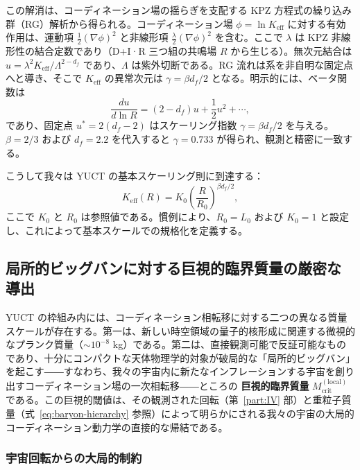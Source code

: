 \documentclass[11pt,a4paper]{article}
\newcommand{\Keff}{K_{\mathrm{eff}}}
\newcommand{\Lzero}{L_0}
\begin{document}
	この解消は、コーディネーション場の揺らぎを支配する KPZ 方程式の繰り込み群（RG）解析から得られる。コーディネーション場 \(\phi = \ln \Keff\) に対する有効作用は、運動項 \(\frac{1}{2}(\nabla \phi)^2\) と非線形項 \(\frac{\lambda}{2}(\nabla \phi)^2\) を含む。ここで \(\lambda\) は KPZ 非線形性の結合定数であり（D+I·R 三つ組の共鳴場 \(R\) から生じる）。無次元結合は \(u = \lambda^2 \Keff / \Lambda^{2-d_f}\) であり、\(\Lambda\) は紫外切断である。RG 流れは系を非自明な固定点へと導き、そこで \(\Keff\) の異常次元は \(\gamma = \beta d_f / 2\) となる。明示的には、ベータ関数は
	\[
	\frac{du}{d\ln R} = (2 - d_f) u + \frac{1}{2} u^2 + \cdots,
	\]
	であり、固定点 \(u^* = 2(d_f - 2)\) はスケーリング指数 \(\gamma = \beta d_f / 2\) を与える。\(\beta = 2/3\) および \(d_f = 2.2\) を代入すると \(\gamma = 0.733\) が得られ、観測と精密に一致する。
	
	こうして我々は YUCT の基本スケーリング則に到達する：
	\begin{equation}
		\Keff(R) = K_0 \left( \frac{R}{R_0} \right)^{\beta d_f / 2},
		\label{eq:keff-scaling}
	\end{equation}
	ここで \(K_0\) と \(R_0\) は参照値である。慣例により、\(R_0 = \Lzero\) および \(K_0 = 1\) と設定し、これによって基本スケールでの規格化を定義する。
	
	\subsection{局所的ビッグバンに対する巨視的臨界質量の厳密な導出}
	\label{subsec:Mcrit-macroscopic}
	
	YUCT の枠組み内には、コーディネーション相転移に対する二つの異なる質量スケールが存在する。第一は、新しい時空領域の量子的核形成に関連する微視的なプランク質量（\(\sim 10^{-8}\) kg）である。第二は、直接観測可能で反証可能なものであり、十分にコンパクトな天体物理学的対象が破局的な「局所的ビッグバン」を起こす――すなわち、我々の宇宙内に新たなインフレーションする宇宙を創り出すコーディネーション場の一次相転移――ところの \textbf{巨視的臨界質量} \(M_{\mathrm{crit}}^{\mathrm{(local)}}\) である。この巨視的閾値は、その観測された回転（第~\ref{part:IV} 部）と重粒子質量（式~\ref{eq:baryon-hierarchy} 参照）によって明らかにされる我々の宇宙の大局的コーディネーション動力学の直接的な帰結である。
	
	\subsubsection{宇宙回転からの大局的制約}
	
\end{document}

